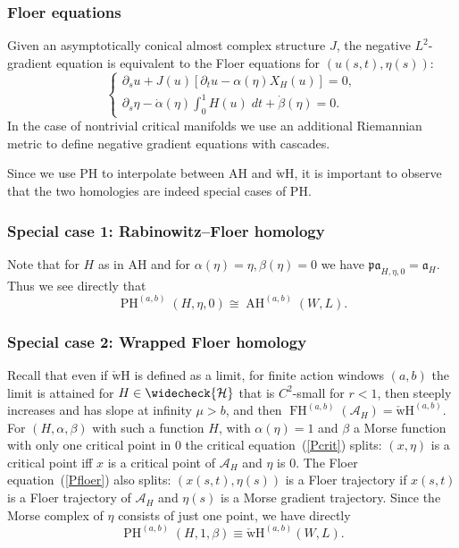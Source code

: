 \documentclass{amsart}
\newcommand{\Acal}{{\mathcal{A}}}
\newcommand{\Hcal}{{\mathcal{H}}}
\newcommand{\acal}{\mathfrak{a}}
\newcommand{\pacal}{\mathfrak{pa}}
\newcommand{\FH}{\operatorname{FH}}
\newcommand{\AH}{\operatorname{AH}}
\newcommand{\PH}{\operatorname{PH}}
\newcommand{\WcheckH}{\operatorname{\check wH}}
\theoremstyle{definition}
\theoremstyle{remark}
\numberwithin{equation}{section}
\begin{document}
\subsubsection*{Floer equations}
Given an asymptotically conical almost complex structure $J$, the negative $L^2$-gradient equation is equivalent to the Floer equations for $(u(s,t),\eta(s))$:
\begin{equation}
\label{Pfloer}
	\begin{cases}
		\partial_s u+J(u)[\partial_t u-\alpha(\eta)X_H(u)]=0,\\
		\partial_s\eta -\dot\alpha(\eta)\int_0^1H(u)\;dt+\dot\beta(\eta)=0.
	\end{cases}
\end{equation}
In the case of nontrivial critical manifolds we use an additional Riemannian metric to define negative gradient equations with cascades.

Since we use PH to interpolate between AH and $\WcheckH$, it is important to observe that the two homologies are indeed special cases of PH.

\subsubsection*{Special case 1: Rabinowitz--Floer homology}
Note that for $H$ as in AH and for $\alpha(\eta)=\eta,\beta(\eta)=0$ we have $\pacal_{H,\eta,0}=\acal_H$. Thus we see directly that 
$$\PH^{(a,b)}(H,\eta,0)\cong\AH^{(a,b)}(W,L).$$

\subsubsection*{Special case 2: Wrapped Floer homology}
Recall that even if $\WcheckH$ is defined as a limit, for finite action windows $(a,b)$ the limit is attained for $H\in\widecheck\Hcal$ that is $C^2$-small for $r<1$, then steeply increases and has slope at infinity $\mu>b$, and then $\FH^{(a,b)}(\Acal_H)=\WcheckH^{(a,b)}$. For $(H,\alpha,\beta)$ with such a function $H$, with $\alpha(\eta)=1$ and $\beta$ a Morse function with only one critical point in 0 the critical equation~(\ref{Pcrit}) splits: $(x,\eta)$ is a critical point iff $x$ is a critical point of $\Acal_H$ and $\eta$ is 0. The Floer equation~(\ref{Pfloer}) also splits: $(x(s,t),\eta(s))$ is a Floer trajectory if $x(s,t)$ is a Floer trajectory of $\Acal_H$ and $\eta(s)$ is a Morse gradient trajectory. Since the Morse complex of $\eta$ consists of just one point, we have directly 
$$\PH^{(a,b)}(H,1,\beta)\equiv \WcheckH^{(a,b)}(W,L).$$
\end{document}

